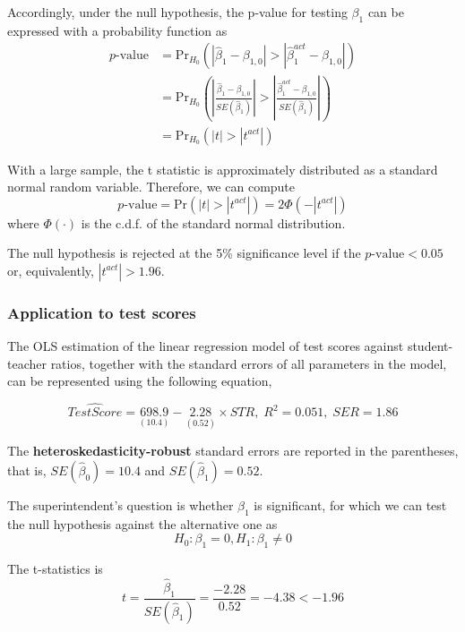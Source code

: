 \documentclass[a4paper,11pt]{article}
\newcommand{\pr}{\mathrm{Pr}}
\begin{document}
Accordingly, under the null hypothesis, the p-value for
testing \(\beta_1\) can be expressed with a probability function as
\begin{equation*}
\begin{split}
p\text{-value} &= \pr_{H_0} \left( | \hat{\beta}_1 - \beta_{1,0} | > | \hat{\beta}^{act}_1 - \beta_{1,0} | \right) \\
&= \pr_{H_0} \left( \left| \frac{\hat{\beta}_1 - \beta_{1,0}}{SE(\hat{\beta}_1)} \right| > \left| \frac{\hat{\beta}^{act}_1 - \beta_{1,0}}{SE(\hat{\beta}_1)} \right| \right) \\
&= \pr_{H_0} \left( |t| > |t^{act}| \right)
\end{split}
\end{equation*}

With a large sample, the t statistic is approximately distributed as
a standard normal random variable. Therefore, we can compute
\[p\text{-value} = \pr\left(|t| > |t^{act}|
\right) = 2 \Phi(-|t^{act}|)\]
where \(\Phi(\cdot)\) is the c.d.f. of the standard normal
distribution.

The null hypothesis is rejected at the 5\% significance level if the
\(p\text{-value} < 0.05\) or, equivalently, \(|t^{act}| > 1.96\).

\subsubsection*{Application to test scores}
\label{sec:orgd4e3a45}

The OLS estimation of the linear regression model of test scores
against student-teacher ratios, together with the standard errors of
all parameters in the model, can be represented using the following
equation,

\begin{equation*}
\widehat{TestScore} = \underset{\displaystyle (10.4)}{698.9} - \underset{\displaystyle (0.52)}{2.28} \times STR,\; R^2 = 0.051,\; SER = 1.86
\end{equation*}

The \textbf{heteroskedasticity-robust} standard errors are reported in the
parentheses, that is, \(SE(\hat{\beta}_0) = 10.4\) and
\(SE(\hat{\beta}_1) = 0.52\).

The superintendent's question is whether \(\beta_1\) is significant, for
which we can test the null hypothesis against the alternative one as
\[ H_0: \beta_1 = 0, H_1: \beta_1 \neq 0 \]

The t-statistics is
\[ t = \frac{\hat{\beta}_1}{SE(\hat{\beta}_1)} = \frac{-2.28}{0.52}
= -4.38 < -1.96 \]
\end{document}
